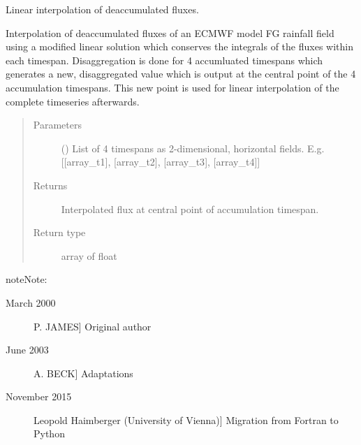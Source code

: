 \documentclass[letterpaper,10pt,english]{sphinxmanual}
\begin{document}

\begin{fulllineitems}
\label{\detokenize{api:disaggregation.darain}}
Linear interpolation of deaccumulated fluxes.

Interpolation of deaccumulated fluxes of an ECMWF model FG rainfall
field using a modified linear solution which conserves the integrals
of the fluxes within each timespan.
Disaggregation is done for 4 accumluated timespans which generates
a new, disaggregated value which is output at the central point
of the 4 accumulation timespans. This new point is used for linear
interpolation of the complete timeseries afterwards.
\begin{quote}\begin{description}
\item[{Parameters}] \leavevmode
{} () \textendash{} List of 4 timespans as 2-dimensional, horizontal fields.
E.g. {[}{[}array\_t1{]}, {[}array\_t2{]}, {[}array\_t3{]}, {[}array\_t4{]}{]}

\item[{Returns}] \leavevmode
{} \textendash{} Interpolated flux at central point of accumulation timespan.

\item[{Return type}] \leavevmode
array of float

\end{description}\end{quote}

\begin{sphinxadmonition}{note}{Note:}\begin{description}
\item[{March 2000}] \leavevmode{[}P. JAMES{]}
Original author

\item[{June 2003}] \leavevmode{[}A. BECK{]}
Adaptations

\item[{November 2015}] \leavevmode{[}Leopold Haimberger (University of Vienna){]}
Migration from Fortran to Python

\end{description}
\end{sphinxadmonition}

\end{fulllineitems}
\end{document}
